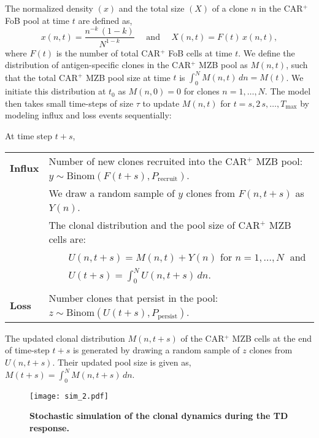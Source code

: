 \documentclass[11pt]{article}
\begin{document}
The normalized density $(x)$ and the total size $(X)$ of a clone $n$ in the CAR$^{+}$ FoB pool at time $t$ are defined as,
$$
x(n, t) = \frac{n^{-k} \, (1-k)}{N^{1-k}} \quad  \text{ and }  %
\quad 
X(n,t) = F(t) \, x(n,t),
$$
where $F(t)$ is the number of total CAR$^{+}$ FoB cells at time $t$.
We define the distribution of antigen-specific clones in the CAR$^{+}$ MZB pool as $M(n,t)$, such that the total CAR$^{+}$ MZB pool size at time $t$ is $\int_{0}^{N} M(n, t) \,dn = M(t)$. We initiate this distribution at $t_0$ as $M(n, 0) = 0$ for clones $n=1, \dots, N$.
The model then takes small time-steps of size $\tau$ to update $M(n, t)$ for $t = s, 2\,s, \dots ,T_\text{max}$ by modeling influx and loss events sequentially:


At time step $t + s$, %

\begin{tabular}{ll}
\textbf{Influx} & Number of new clones recruited into the CAR$^{+}$ MZB pool: $y \sim \text{Binom}(F(t+s), P_\text{recruit})$. \\
& We draw a random sample of $y$ clones from $F(n, t+s)$ as $Y(n)$. \\
& The clonal distribution and the pool size of CAR$^{+}$ MZB cells are: \\ 
& $\qquad U(n, t+s) = M(n, t) + Y(n)$ for $n=1, \dots, N \; $ and \\
& $\qquad U(t+s) = \int_{0}^{N} U(n, t+s) \, dn$. \\
\\
\textbf{Loss} & Number clones that persist in the pool: $z \sim \text{Binom}(U(t+s), P_\text{persist})$.  
\end{tabular}

The updated clonal distribution $M(n, t+s)$ of the CAR$^{+}$ MZB cells at the end of time-step $t+s$ is generated by drawing a random sample of $z$ clones from $U(n, t+s)$. Their updated pool size is given as,
$M(t+s) = \int_{0}^{N} M(n, t+s) \, dn.$
\begin{figure}[!h]
\centering
\texttt{[image: sim\_2.pdf]}
\caption{
    \textbf{Stochastic simulation of the clonal dynamics during the TD response.}
    }
\label{fig:clone-dyn} 
\end{figure}
\end{document}
